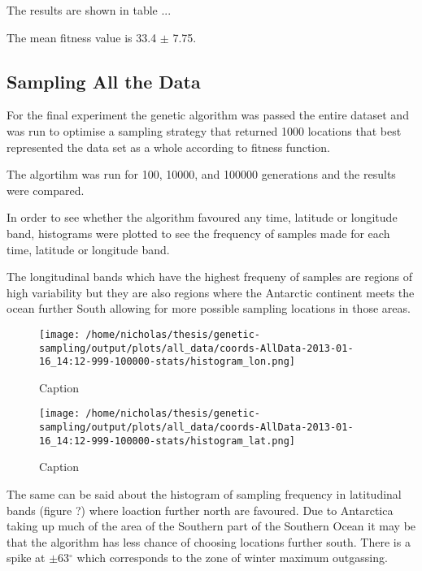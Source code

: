 \documentclass[11pt, a4paper]{article}
\numberwithin{figure}{section}
\numberwithin{table}{section}
\begin{document}
The results are shown in table ...

The mean fitness value is 33.4 $\pm$ 7.75.



\subsection{Sampling All the Data}

For the final experiment the genetic algorithm was passed the entire
dataset and was run to optimise a sampling strategy that returned
1000 locations that best represented the data set as a whole according 
to fitness function.

The algortihm was run for 100, 10000, and 100000 generations and the
results were compared. 

In order to see whether the algorithm favoured any time, latitude or 
longitude band, histograms were plotted to see the frequency of samples 
made for each time, latitude or longitude band.
    
The longitudinal bands which have the highest frequeny of samples
are regions of high variability but they are also regions where the
Antarctic continent meets the ocean further South allowing for more
possible sampling locations in those areas.

\begin{figure}[H]
\caption{Caption}
\centering
\texttt{[image: /home/nicholas/thesis/genetic-sampling/output/plots/all\_data/coords-AllData-2013-01-16\_14:12-999-100000-stats/histogram\_lon.png]}
\end{figure}

\begin{figure}[H]
\caption{Caption}
\centering
\texttt{[image: /home/nicholas/thesis/genetic-sampling/output/plots/all\_data/coords-AllData-2013-01-16\_14:12-999-100000-stats/histogram\_lat.png]}
\end{figure}

The same can be said about the histogram of sampling frequency in
latitudinal bands (figure ?) where loaction further north are favoured.
Due to Antarctica taking up much of the area of the Southern part of the Southern
Ocean it may be that the algorithm has less chance of choosing locations further south.
There is a spike at $\pm$63$^{\circ}$ which corresponds to the zone of winter maximum
outgassing.
\end{document}
